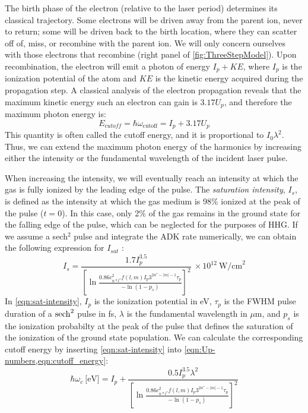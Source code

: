 The birth phase of the electron (relative to the laser period) determines its classical trajectory. Some electrons will be driven away from the parent ion, never to return; some will be driven back to the birth location, where they can scatter off of, miss, or recombine with the parent ion. We will only concern ourselves with those electrons that recombine (right panel of \cref{fig:ThreeStepModel}). Upon recombination, the electron will emit a photon of energy $I_p + KE$, where $I_p$ is the ionization potential of the atom and $KE$ is the kinetic energy acquired during the propagation step. A classical analysis of the electron propagation reveals that the maximum kinetic energy such an electron can gain is $3.17 U_p$, and therefore the maximum photon energy is: 
\begin{equation}
E_{cutoff} = \hbar \omega_{\textrm{cutoff}} = I_p + 3.17 U_p
\label{eqn:cutoff_energy}
\end{equation}
This quantity is often called the cutoff energy, and it is proportional to $I_0 \lambda^2$. Thus, we can extend the maximum photon energy of the harmonics by increasing either the intensity or the fundamental wavelength of the incident laser pulse.

When increasing the intensity, we will eventually reach an intensity at which the gas is fully ionized by the leading edge of the pulse. The \textit{saturation intensity}, $I_s$, is defined as the intensity at which the gas medium is 98\% ionized at the peak of the pulse ($t=0$). In this case, only 2\% of the gas remains in the ground state for the falling edge of the pulse, which can be neglected for the purposes of HHG. If we assume a sech$^2$ pulse and integrate the ADK rate numerically, we can obtain the following expression for $I_{sat}$ \cite{changFundamentalsAttosecondOptics2011}:
\begin{equation}
I_s = \frac{1.7 I_p^{3.5}}{\left[ \ln \frac{0.86 c_{n*l^*}^2 f(l,m) I_p 3^{2n^*-|m|-1} \tau_p}{- \ln(1-p_s)}\right]^2} \ \times 10^{12} \ \textrm{W/cm}^2
\label{eqn:sat-intensity}
\end{equation}
In \cref{eqn:sat-intensity}, $I_p$ is the ionization potential in eV, $\tau_p$ is the FWHM pulse duration of a $\sech^2$ pulse in fs, $\lambda$ is the fundamental wavelength in $\mu$m, and $p_s$ is the ionization probabilty at the peak of the pulse that defines the saturation of the ionization of the ground state population. We can calculate the corresponding cutoff energy by inserting \cref{eqn:sat-intensity} into \cref{eqn:Up-numbers,eqn:cutoff_energy}:
\begin{equation}
\hbar \omega_c \ \textrm{[eV]} = I_p + \frac{0.5 I_p^{3.5} \lambda^2}{\left[ \ln \frac{0.86 c_{n*l^*}^2 f(l,m) I_p 3^{2n^*-|m|-1} \tau_p}{- \ln(1-p_s)}\right]^2}
\label{eqn:sat-int-cutoff}
\end{equation}

